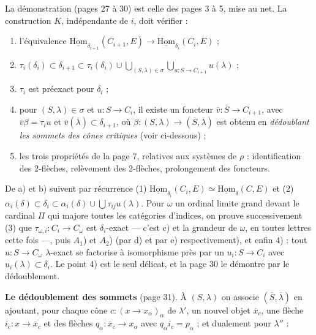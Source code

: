 \documentclass[11pt,a4paper]{article}
\begin{document}
La démonstration (pages 27 à 30) est celle des pages 3 à 5, mise au net.
La construction $K$, indépendante de $i$, doit vérifier :
\begin{enumerate}
\item[a)] l'équivalence $\underline{\mathrm{Hom}}_{\delta_{i+1}}(C_{i+1}, E)
\to \underline{\mathrm{Hom}}_{\delta_{i}}(C_{i}, E)$ ;
\item[b)] $\tau_{i}(\delta_{i}) \subset \delta_{i+1} \subset
\tau_{i}(\delta_{i}) \cup \bigcup_{(S,\lambda) \in \sigma} \bigcup_{u : S
\to C_{i+1}} u(\lambda)$ ;
\item[c)] $\tau_{i}$ est préexact pour $\delta_{i}$ ;
\item[d)] pour $(S, \lambda) \in \sigma$ et $u : S \to C_{i}$, il existe un
foncteur $\overline{v} : \overline{S} \to C_{i+1}$, avec $\overline{v}
\beta = \tau_{i} u$ et $\overline{v}(\overline{\lambda}) \subset
\delta_{i+1}$, où $\beta : (S, \lambda) \to (\overline{S},
\overline{\lambda})$ est obtenu en \emph{dédoublant les sommets des cônes
critiques} (voir ci-dessous) ;
\item[$e_{0}$)--$e_{2}$)] les trois propriétés de la page 7, relatives aux
systèmes de $\rho$ : identification des 2-flèches, relèvement des
2-flèches, prolongement des foncteurs.
\end{enumerate}
De a) et b) suivent par récurrence (1) $\underline{\mathrm{Hom}}_{\delta_{i}}
(C_{i}, E) \simeq \underline{\mathrm{Hom}}_{\delta}(C, E)$ et (2)
$\alpha_{i}(\delta) \subset \delta_{i} \subset \alpha_{i}(\delta) \cup
\bigcup \tau_{ij} u(\lambda)$. Pour $\omega$ un ordinal limite grand devant
le cardinal $\Pi$ qui majore toutes les catégories d'indices, on prouve
successivement (3) que $\tau_{\omega,i} : C_{i} \to C_{\omega}$ est
$\delta_{i}$-exact — c'est c) et la grandeur de $\omega$, en toutes lettres
cette fois —, puis $A_{1}$) et $A_{2}$) (par d) et par e) respectivement),
et enfin 4) : tout $u : S \to C_{\omega}$ $\lambda$-exact se factorise à
isomorphisme près par un $u_{i} : S \to C_{i}$ avec $u_{i}(\lambda) \subset
\delta_{i}$. Le point 4) est le seul délicat, et la page 30 le démontre par
le dédoublement.

\textbf{Le dédoublement des sommets} (page 31). À $(S, \lambda)$ on associe
$(\overline{S}, \overline{\lambda})$ en ajoutant, pour chaque cône $c : (x
\to x_{\alpha})_{\alpha}$ de $\lambda'$, un nouvel objet $\overline{x}_{c}$,
une flèche $i_{c} : x \to \overline{x}_{c}$ et des flèches $q_{\alpha} :
\overline{x}_{c} \to x_{\alpha}$ avec $q_{\alpha} i_{c} = p_{\alpha}$ ; et
dualement pour $\lambda''$ :
\end{document}

